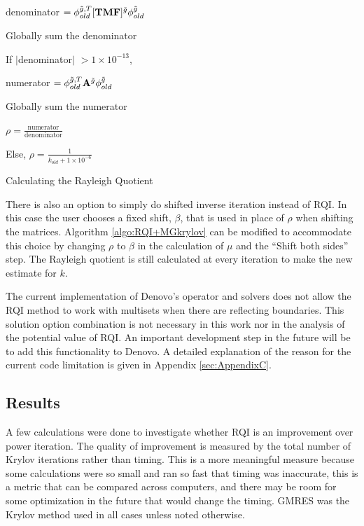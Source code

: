 %
\begin{algorithm}[!h]
  \begin{list}{}{\hspace{2.5em}}
    \item denominator $= \phi_{old}^{\tilde{g}, T} [\mathbf{TMF}]^{\tilde{g}} \phi_{old}^{\tilde{g}}$
    \item Globally sum the denominator
    \item If $|$denominator$|$ $> 1 \times 10^{-13}$, 
      \begin{list}{}{\hspace{1em}}
        \item numerator  $= \phi_{old}^{\tilde{g}, T} \mathbf{A}^{\tilde{g}} \phi_{old}^{\tilde{g}}$
        \item Globally sum the numerator
        \item $\rho = \frac{\text{numerator}}{\text{denominator}}$
      \end{list}
    \item Else, $\rho = \frac{1}{k_{old} + 1 \times 10^{-6}}$ 
  \end{list}
  \caption{Calculating the Rayleigh Quotient}
  \label{algo:calcRQ}
\end{algorithm}

There is also an option to simply do shifted inverse iteration instead of RQI. In this case the user chooses a fixed shift, $\beta$, that is used in place of $\rho$ when shifting the matrices. Algorithm \ref{algo:RQI+MGkrylov} can be modified to accommodate this choice by changing $\rho$ to $\beta$ in the calculation of $\mu$ and the ``Shift both sides'' step. The Rayleigh quotient is still calculated at every iteration to make the new estimate for $k$. 

The current implementation of Denovo's operator and solvers does not allow the RQI method to work with multisets when there are reflecting boundaries. This solution option combination is not necessary in this work nor in the analysis of the potential value of RQI. An important development step in the future will be to add this functionality to Denovo. A detailed explanation of the reason for the current code limitation is given in Appendix \ref{sec:AppendixC}.

\subsection{Results}
A few calculations were done to investigate whether RQI is an improvement over power iteration. The quality of improvement is measured by the total number of Krylov iterations rather than timing. This is a more meaningful measure because some calculations were so small and ran so fast that timing was inaccurate, this is a metric that can be compared across computers, and there may be room for some optimization in the future that would change the timing. GMRES was the Krylov method used in all cases unless noted otherwise.

